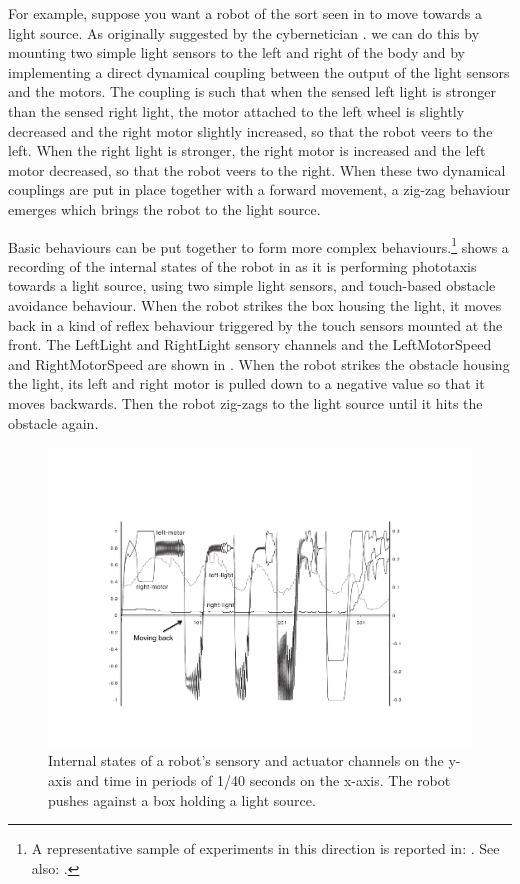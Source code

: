 For example, suppose you want a robot of the sort seen 
in  to move towards a light source. As originally 
suggested by the cybernetician \cite{Braitenberg:1984}. 
we can do this by mounting two simple light sensors 
to the left and right of the body and by implementing a 
direct dynamical coupling between the output of the light
sensors and the motors. The coupling is such that when
the sensed left light is stronger than the sensed right
light, the motor attached
to the left wheel is slightly decreased and the right
motor slightly increased, so that the robot veers to the left. 
When the right light is stronger, the right motor is 
increased and the left motor decreased, so that the 
robot veers to the right. When these two dynamical 
couplings are put in place together with a
forward movement, a zig-zag behaviour emerges which
brings the robot to the light source. 

Basic behaviours can be put together to form 
more complex behaviours.\footnote{A representative sample of experiments in this 
direction is reported in: \cite{Steels:1996}. See 
also: \cite{Arkin:1998}.}
shows a recording of the internal states of the robot
in  as it is performing 
phototaxis towards a light source, using two simple
light sensors, and touch-based obstacle avoidance
behaviour.  When the robot strikes the box housing 
the light, it moves back in a kind of reflex behaviour
triggered by the touch sensors mounted at the front. 
The LeftLight and 
RightLight sensory channels and the LeftMotorSpeed
and RightMotorSpeed are shown 
in . When the robot strikes
the obstacle housing the light, its left and right
motor is pulled down to a negative value so that 
it moves backwards. Then the robot zig-zags to the 
light source until it hits the obstacle again. 

\begin{figure}[htbp]
  \centerline{\includegraphics[width=.85\textwidth]{chap3/figs/phototaxis}}
\caption{\label{phototaxis} 
Internal states of a robot's sensory and actuator channels on 
the y-axis and time in periods of 1/40 seconds on the x-axis.
The robot pushes against a box holding a light source.}
\end{figure}

